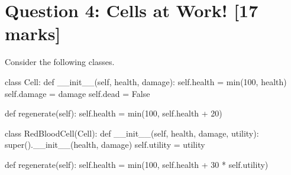 \newpage
\section{Question 4: Cells at Work! [17 marks]}
Consider the following classes.
\begin{python}
class Cell:
    def __init__(self, health, damage):
        self.health = min(100, health)
        self.damage = damage
        self.dead = False

    def regenerate(self):
        self.health = min(100, self.health + 20)

class RedBloodCell(Cell):
    def __init__(self, health, damage, utility):
        super().__init__(health, damage)
        self.utility = utility

    def regenerate(self):
        self.health = min(100, self.health + 30 * self.utility)
\end{python}

